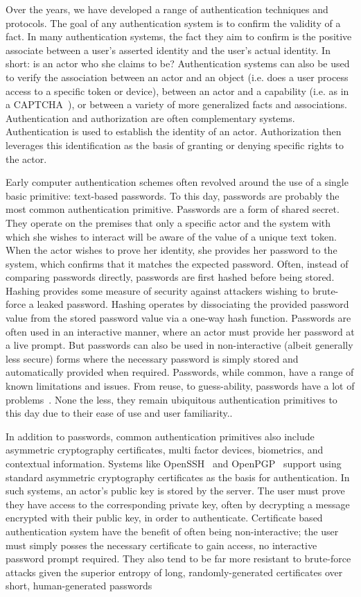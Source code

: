 Over the years, we have developed a range of authentication techniques
and protocols. The goal of any authentication system is to confirm the
validity of a fact. In many authentication systems, the fact they aim
to confirm is the positive associate between a user's asserted
identity and the user's actual identity. In short: is an actor who she
claims to be? Authentication systems can also be used to verify the
association between an actor and an object (i.e. does a user process
access to a specific token or device), between an actor and a
capability (i.e. as in a CAPTCHA~\cite{captcha}), or between a variety
of more generalized facts and associations. Authentication and
authorization are often complementary systems. Authentication is used
to establish the identity of an actor. Authorization then leverages
this identification as the basis of granting or denying specific
rights to the actor.

Early computer authentication schemes often revolved around the use of
a single basic primitive: text-based passwords. To this day, passwords
are probably the most common authentication primitive. Passwords are a
form of shared secret. They operate on the premises that only a
specific actor and the system with which she wishes to interact will
be aware of the value of a unique text token. When the actor wishes to
prove her identity, she provides her password to the system, which
confirms that it matches the expected password. Often, instead of
comparing passwords directly, passwords are first hashed before being
stored. Hashing provides some measure of security against attackers
wishing to brute-force a leaked password. Hashing operates by
dissociating the provided password value from the stored password
value via a one-way hash function. Passwords are often used in an
interactive manner, where an actor must provide her password at a live
prompt. But passwords can also be used in non-interactive (albeit
generally less secure) forms where the necessary password is simply
stored and automatically provided when required. Passwords, while
common, have a range of known limitations and issues. From reuse, to
guess-ability, passwords have a lot of
problems~\cite{singer-passwords, goodin-passwords, goodin-bible}. None
the less, they remain ubiquitous authentication primitives to this day
due to their ease of use and user familiarity..

In addition to passwords, common authentication primitives also
include asymmetric cryptography certificates, multi factor devices,
biometrics, and contextual information. Systems like
OpenSSH~\cite{openSSH} and OpenPGP~\cite{openpgp} support using
standard asymmetric cryptography certificates as the basis for
authentication. In such systems, an actor's public key is stored by
the server. The user must prove they have access to the corresponding
private key, often by decrypting a message encrypted with their public
key, in order to authenticate. Certificate based authentication system
have the benefit of often being non-interactive; the user must simply
posses the necessary certificate to gain access, no interactive
password prompt required. They also tend to be far more resistant to
brute-force attacks given the superior entropy of long,
randomly-generated certificates over short, human-generated passwords

